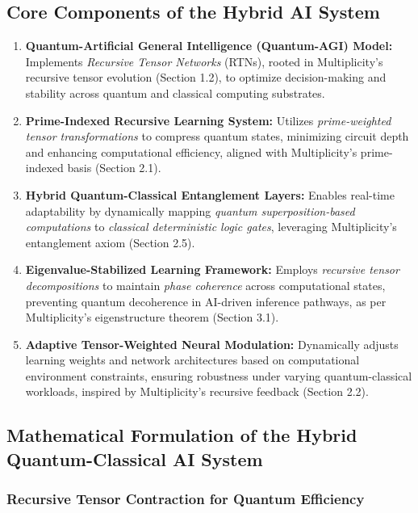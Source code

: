 \documentclass[12pt]{article}
\begin{document}
\subsection{Core Components of the Hybrid AI System}

\begin{enumerate}
    \item \textbf{Quantum-Artificial General Intelligence (Quantum-AGI) Model:} Implements \textit{Recursive Tensor Networks} (RTNs), rooted in Multiplicity’s recursive tensor evolution (Section 1.2), to optimize decision-making and stability across quantum and classical computing substrates.
    \item \textbf{Prime-Indexed Recursive Learning System:} Utilizes \textit{prime-weighted tensor transformations} to compress quantum states, minimizing circuit depth and enhancing computational efficiency, aligned with Multiplicity’s prime-indexed basis (Section 2.1).
    \item \textbf{Hybrid Quantum-Classical Entanglement Layers:} Enables real-time adaptability by dynamically mapping \textit{quantum superposition-based computations} to \textit{classical deterministic logic gates}, leveraging Multiplicity’s entanglement axiom (Section 2.5).
    \item \textbf{Eigenvalue-Stabilized Learning Framework:} Employs \textit{recursive tensor decompositions} to maintain \textit{phase coherence} across computational states, preventing quantum decoherence in AI-driven inference pathways, as per Multiplicity’s eigenstructure theorem (Section 3.1).
    \item \textbf{Adaptive Tensor-Weighted Neural Modulation:} Dynamically adjusts learning weights and network architectures based on computational environment constraints, ensuring robustness under varying quantum-classical workloads, inspired by Multiplicity’s recursive feedback (Section 2.2).
\end{enumerate}

\subsection{Mathematical Formulation of the Hybrid Quantum-Classical AI System}

\subsubsection{Recursive Tensor Contraction for Quantum Efficiency}
\end{document}
